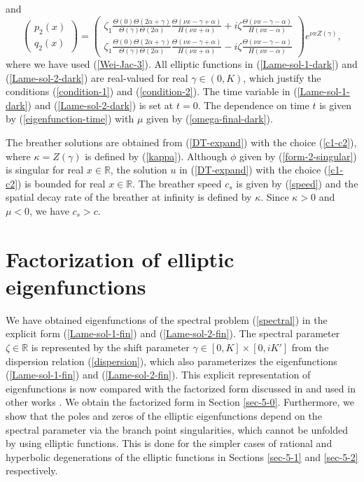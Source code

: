\documentclass[12pt,reqno]{amsart}
\numberwithin{equation}{section}
\begin{document}
and
\begin{equation}
\label{Lame-sol-2-dark}
\left( \begin{matrix} p_2(x) \\ q_2(x) \end{matrix} \right) = 
\left( \begin{matrix}  \zeta_1 \frac{\Theta(0) \Theta(2\alpha + \gamma)}{\Theta(\gamma) \Theta(2\alpha)}\frac{\Theta(\nu x - \gamma + \alpha)}{H(\nu x + \alpha)} +  i\zeta \frac{\Theta(\nu x - \gamma - \alpha)}{H(\nu x - \alpha)} \\ 
\zeta_1 \frac{\Theta(0) \Theta(2\alpha + \gamma)}{\Theta(\gamma) \Theta(2\alpha)}\frac{\Theta(\nu x - \gamma + \alpha)}{H(\nu x + \alpha)} -  i\zeta \frac{\Theta(\nu x - \gamma - \alpha)}{H(\nu x - \alpha)} \end{matrix} \right) e^{\nu x Z(\gamma)},
\end{equation}
where we have used (\ref{Wei-Jac-3}). All elliptic functions 
in (\ref{Lame-sol-1-dark}) and (\ref{Lame-sol-2-dark}) 
are real-valued for real $\gamma \in (0,K)$, 
which justify the conditions (\ref{condition-1}) and (\ref{condition-2}). 
The time variable in (\ref{Lame-sol-1-dark}) and (\ref{Lame-sol-2-dark}) is set at $t = 0$. The dependence on time $t$ is given by (\ref{eigenfunction-time}) with $\mu$ given by (\ref{omega-final-dark}). 

The breather solutions are obtained from (\ref{DT-expand}) with the choice (\ref{c1-c2}), where $\kappa = Z(\gamma)$ is defined by (\ref{kappa}). Although $\phi$ given by (\ref{form-2-singular}) is singular for real $x \in \mathbb{R}$, the solution $u$ in (\ref{DT-expand}) with the choice (\ref{c1-c2}) is bounded for real $x \in \mathbb{R}$. The breather speed $c_s$ is given by (\ref{speed}) and the spatial decay rate of the breather at infinity is defined by $\kappa$. Since $\kappa > 0$ and $\mu < 0$, we have $c_s > c$.



\section{Factorization of elliptic eigenfunctions}
\label{sec-5}

We have obtained eigenfunctions of the spectral problem (\ref{spectral}) in the explicit form (\ref{Lame-sol-1-fin}) and (\ref{Lame-sol-2-fin}). The spectral parameter $\zeta \in \mathbb{R}$ is represented by the shift parameter $\gamma \in [0,K] \times [0,iK']$ from the dispersion relation (\ref{dispersion}), which also parameterizes the eigenfunctions (\ref{Lame-sol-1-fin}) and (\ref{Lame-sol-2-fin}). This explicit representation of eigenfunctions is now compared with the factorized form discussed in \cite{AP25} and 
used in other works \cite{Geng,Geng3}. We obtain the factorized form
in Section \ref{sec-5-0}. Furthermore, we show that the poles and zeros of the elliptic eigenfunctions depend on the spectral parameter via the branch point singularities, which cannot be unfolded by using elliptic functions. This is done 
for the simpler cases of rational and hyperbolic degenerations of the elliptic functions in Sections \ref{sec-5-1} and \ref{sec-5-2} respectively. 
\end{document}

